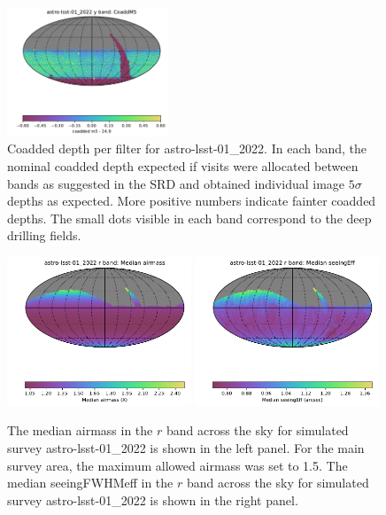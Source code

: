 \documentclass[DM,authoryear,toc]{lsstdoc}
\begin{document}
\begin{figure}[ht]
\includegraphics[width=0.43\textwidth]{figures/astro-lsst-01_2022_CoaddM5_y_band_HEAL_SkyMap}
\caption{Coadded depth per filter for astro-lsst-01\_2022. In each band, the nominal coadded depth expected if
visits were allocated between bands as suggested in the SRD and obtained individual image $5\sigma$ depths 
as expected. More positive numbers indicate fainter coadded depths. The small dots visible in each band correspond
to the deep drilling fields.
\label{fig:baseline_coadd}}
\end{figure}

\begin{figure}[ht]
\centering
\includegraphics[width=0.49\textwidth]{figures/astro-lsst-01_2022_Median_airmass_r_band_HEAL_SkyMap}
\includegraphics[width=0.49\textwidth]{figures/astro-lsst-01_2022_Median_seeingEff_r_band_HEAL_SkyMap}
\caption{The median airmass in the $r$ band across the sky for simulated survey
astro-lsst-01\_2022 is shown in the left panel. For the main survey area, the maximum
allowed airmass was set to 1.5. The median seeingFWHMeff in the $r$ band across the sky 
for simulated survey astro-lsst-01\_2022 is shown in the right panel.}
\label{fig:baseline_airmass}
\end{figure}
\end{document}
